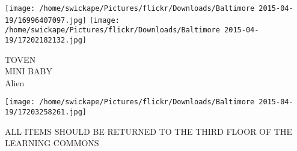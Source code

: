 \documentclass[10pt,letterpaper]{article}
\begin{document}
\vspace{0.25in}
\texttt{[image: /home/swickape/Pictures/flickr/Downloads/Baltimore 2015-04-19/16996407097.jpg]}
\texttt{[image: /home/swickape/Pictures/flickr/Downloads/Baltimore 2015-04-19/17202182132.jpg]}

TOVEN\\
MINI BABY\\
Alien\\
\pagebreak

\texttt{[image: /home/swickape/Pictures/flickr/Downloads/Baltimore 2015-04-19/17203258261.jpg]}

ALL ITEMS SHOULD BE RETURNED TO THE THIRD FLOOR OF THE LEARNING COMMONS\\
\pagebreak
\end{document}
